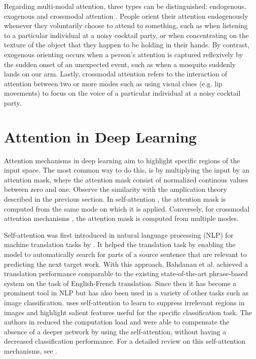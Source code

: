 Regarding multi-modal attention, three types can be distinguished: endogenous, exogenous and crossmodal attention \citep{crossmodal}. People orient their attention endogenously whenever they voluntarily choose to attend to something, such as when listening to a particular individual at a noisy cocktail party, or when concentrating on the texture of the object that they happen to be holding in their hands. By contrast, exogenous orienting occurs when a person’s attention is captured reflexively by the sudden onset of an unexpected event, such as when a mosquito suddenly lands on our arm. Lastly, crossmodal attention refers to the interaction of attention between two or more modes such as using visual clues (e.g. lip movements) to focus on the voice of a particular individual at a noisy cocktail party.


\section{Attention in Deep Learning}
Attention mechanisms in deep learning aim to highlight specific regions of the input space. The most common way to do this, is by multiplying the input by an attention mask, where the attention mask consist of normalized continous values between zero and one. Observe the similarity with the amplication theory described in the previous section. In self-attention \citep{bahdanau}, the attention mask is computed from the same mode on which it is applied. Conversely, for crossmodal attention mechanisms \citep{crossmodal-object-detection}, the attention mask is computed from multiple modes. 

Self-attention was first introduced in natural language processing (NLP) for machine translation tasks by \citep{bahdanau}. It helped the translation task by enabling the model to automatically search for parts of a source sentence that are relevant to predicting the next target work. With this approach, Bahdanau et al. achieved a translation performance comparable to the existing state-of-the-art phrase-based system on the task of English-French translation. Since then it has become a prominent tool in NLP but has also been used in a variety of other tasks such as image classification. \citep{self-capsule} uses self-attention to learn to suppress irrelevant regions in images and highlight salient features useful for the specific classification task. The authors in \citep{self-capsule} reduced the computation load and were able to compensate the absence of a deeper network by using the self-attention, without having a decreased classification performance. For a detailed review on this self-attention mechanisms, see \citep{attention-review}.

